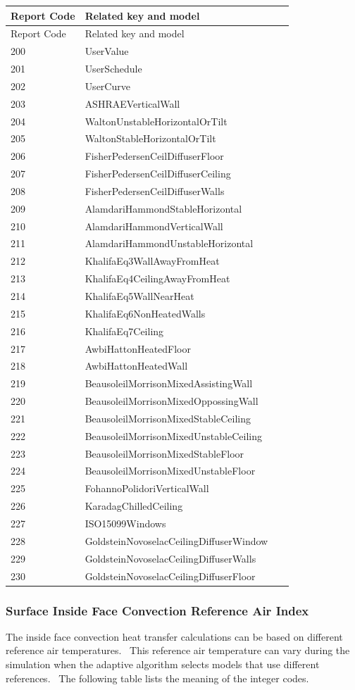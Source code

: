 \begin{longtable}[c]{@{}ll@{}}
\toprule
Report Code & Related key and model \tabularnewline
\midrule
\endfirsthead

\toprule
Report Code & Related key and model \tabularnewline
\midrule
\endhead

200 & UserValue~~~~ \tabularnewline
201 & UserSchedule \tabularnewline
202 & UserCurve~ \tabularnewline
203 & ASHRAEVerticalWall~ \tabularnewline
204 & WaltonUnstableHorizontalOrTilt \tabularnewline
205 & WaltonStableHorizontalOrTilt~~ \tabularnewline
206 & FisherPedersenCeilDiffuserFloor \tabularnewline
207 & FisherPedersenCeilDiffuserCeiling \tabularnewline
208 & FisherPedersenCeilDiffuserWalls~~~~~~~~ \tabularnewline
209 & AlamdariHammondStableHorizontal~~~~~~~~ \tabularnewline
210 & AlamdariHammondVerticalWall~~~~~~~~~~~~ \tabularnewline
211 & AlamdariHammondUnstableHorizontal~~~~~~ \tabularnewline
212 & KhalifaEq3WallAwayFromHeat~~~~~~~~~~~~~ \tabularnewline
213 & KhalifaEq4CeilingAwayFromHeat~~~~~~~~~~ \tabularnewline
214 & KhalifaEq5WallNearHeat~~~~~~~~~~~~~~~~~ \tabularnewline
215 & KhalifaEq6NonHeatedWalls~ \tabularnewline
216 & KhalifaEq7Ceiling~ \tabularnewline
217 & AwbiHattonHeatedFloor~~~~~~~~~~~~~~~~~~ \tabularnewline
218 & AwbiHattonHeatedWall~~~~~~~~~~~~~~~~~~~ \tabularnewline
219 & BeausoleilMorrisonMixedAssistingWall~~~ \tabularnewline
220 & BeausoleilMorrisonMixedOppossingWall~~~ \tabularnewline
221 & BeausoleilMorrisonMixedStableCeiling~~~ \tabularnewline
222 & BeausoleilMorrisonMixedUnstableCeiling~ \tabularnewline
223 & BeausoleilMorrisonMixedStableFloor~~~~~ \tabularnewline
224 & BeausoleilMorrisonMixedUnstableFloor~~~ \tabularnewline
225 & FohannoPolidoriVerticalWall~~~~~~~~~~~~ \tabularnewline
226 & KaradagChilledCeiling~~~~~~~~~~~~~~~~~~ \tabularnewline
227 & ISO15099Windows~~~~~~~~~~~~~~~~~~~~~~~~ \tabularnewline
228 & GoldsteinNovoselacCeilingDiffuserWindow \tabularnewline
229 & GoldsteinNovoselacCeilingDiffuserWalls~ \tabularnewline
230 & GoldsteinNovoselacCeilingDiffuserFloor \tabularnewline
\bottomrule
\end{longtable}

\subsubsection{Surface Inside Face Convection Reference Air Index}\label{surface-inside-face-convection-reference-air-index}

The inside face convection heat transfer calculations can be based on different reference air temperatures.~ This reference air temperature can vary during the simulation when the adaptive algorithm selects models that use different references.~ The following table lists the meaning of the integer codes.

